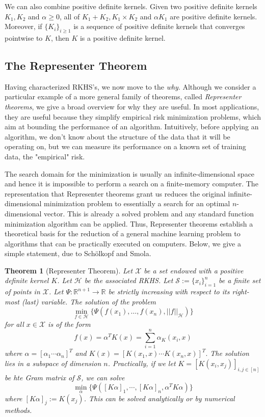 \documentclass[psamsfonts]{amsart}
\newtheorem{thm}{Theorem}[section]
\theoremstyle{definition}
\theoremstyle{remark}
\numberwithin{equation}{section}
\begin{document}
We can also combine positive definite kernels. Given two positive definite kernels $K_1, K_2$ and $\alpha \geq 0$, all of $K_1 + K_2, K_1 \times K_2$ and $\alpha K_1$ are positive definite kernels. Moreover, if $\{ K_i \} _{i \geq 1}$ is a sequence of positive definite kernels that converges pointwise to $K$, then $K$ is a positive definite kernel. 

\subsection{The Representer Theorem}
Having characterized RKHS's, we now move to the \textit{why}. Although we consider a particular example of a more general family of theorems, called \textit{Representer theorems}, we give a broad overview for why they are useful. In most applications, they are useful because they simplify empirical risk minimization problems, which aim at bounding the performance of an algorithm. Intuitively, before applying an algorithm, we don't know about the structure of the data that it will be operating on, but we can measure its performance on a known set of training data, the "empirical" risk.

The search domain for the minimization is usually an infinite-dimensional space and hence it is impossible to perform a search on a finite-memory computer. The representation that Representer theorems grant us reduces the original infinite-dimensional minimization problem to essentially a search for an optimal $n$-dimensional vector. This is already a solved problem and any standard function minimization algorithm can be applied. Thus, Representer theorems establish a theoretical basis for the reduction of a general machine learning problem to algorithms that can be practically executed on computers. Below, we give a simple statement, due to Sch\"{o}lkopf and Smola.

\begin{thm}[Representer Theorem]
Let $\mathcal{X}$ be a set endowed with a positive definite kernel $K$. Let $\mathcal{H}$ be the associated RKHS. Let $\mathcal{S} := \{ x_i \} ^n _{i = 1}$ be a finite set of points in $\mathcal{X}$. Let $\Psi : \mathbb{R}^{n+1} \rightarrow \mathbb{R}$ be strictly increasing with respect to its right-most (last) variable. The solution of the problem 
$$\min _{f \in \mathcal{H}} \{\Psi (f(x_1), \dots , f(x_n), || f||_{\mathcal{H}} ) \} $$
for all $x \in \mathcal{X}$ is of the form 
$$f(x) = \alpha ^T K(x) = \sum _{i =1}^n \alpha _ K(x_i, x) $$
where $\alpha = [\alpha _1 \cdots \alpha _n]^T$ and $K(x) = [K(x_1, x) \cdots K(x_n, x)]^T.$ The solution lies in a subspace of dimension $n$. Practically, if we let $K = [K(x_i, x_j)]_{i,j \in [n]}$ be hte Gram matrix of $\mathcal{S}$, we can solve 
$$\min _\alpha \{\Psi ([K\alpha]_1, \cdots , [K\alpha]_n, \alpha ^T K \alpha ) \} $$
where $[K\alpha]_j := K(x_j)$. This can be solved analytically or by numerical methods. 
\end{thm}
\end{document}
